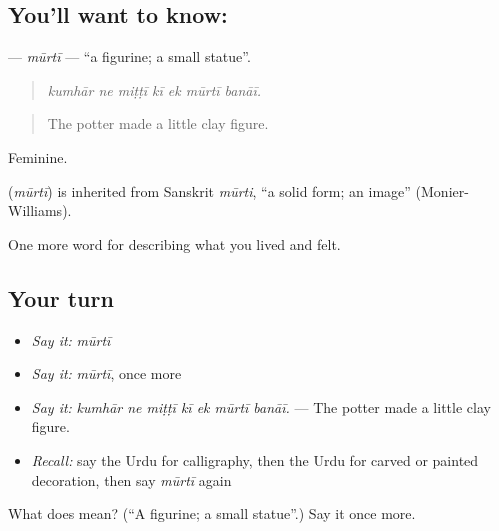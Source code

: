 \subsection*{You'll want to know: }
\textbf{} — \emph{mūrtī} — \textquotedblleft{}a figurine; a small statue\textquotedblright{}.

\begin{quote}
      
\end{quote}

\begin{quote}
\emph{kumhār ne miṭṭī kī ek mūrtī banāī.}
\end{quote}

\begin{quote}
The potter made a little clay figure.
\end{quote}

Feminine.

\begin{cousinweb}
\textbf{} (\emph{mūrtī}) is inherited from Sanskrit \emph{mūrti}, \textquotedblleft{}a solid form; an image\textquotedblright{} (Monier-Williams).
\end{cousinweb}

\begin{grammarlens}[title={What you've built}]
One more word for describing what you lived and felt.
\end{grammarlens}

\subsection*{Your turn}
\begin{itemize}
\raggedright
  \item \emph{Say it:} \emph{mūrtī}
  \item \emph{Say it:} \emph{mūrtī}, once more
  \item \emph{Say it:} \emph{kumhār ne miṭṭī kī ek mūrtī banāī.} — The potter made a little clay figure.
  \item \emph{Recall:} say the Urdu for calligraphy, then the Urdu for carved or painted decoration, then say \emph{mūrtī} again
\end{itemize}

\begin{tcolorbox}[breakable,colback=teal!4,colframe=teal!35!black,title={Before you move on}]
What does  mean? (\textquotedblleft{}A figurine; a small statue\textquotedblright{}.) Say it once more.
\end{tcolorbox}
